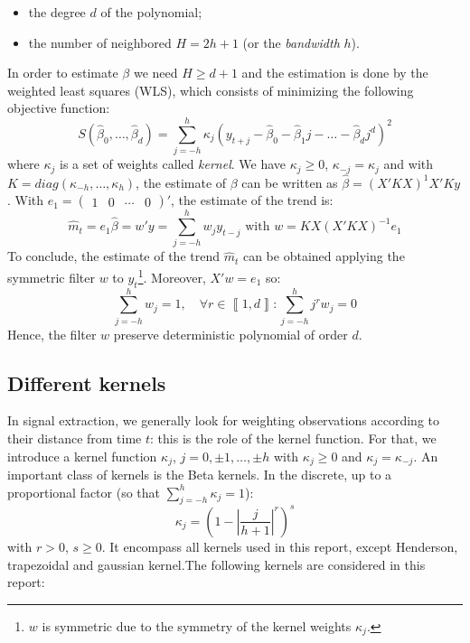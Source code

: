 \documentclass[
  12pt,
  ,
  a4paper]{article}
\newcommand\1{\mathds{1}}
\begin{document}
\begin{itemize}
\item
  the degree \(d\) of the polynomial;
\item
  the number of neighbored \(H=2h+1\) (or the \emph{bandwidth} \(h\)).
\end{itemize}

In order to estimate \(\beta\) we need \(H\geq d+1\) and the estimation is done by the weighted least squares (WLS), which consists of minimizing the following objective function:
\[
S(\hat{\beta}_{0},\dots,\hat{\beta}_{d})=\sum_{j=-h}^{h}\kappa_{j}(y_{t+j}-\hat{\beta}_{0}-\hat{\beta}_{1}j-\dots-\hat{\beta}_{d}j^{d})^{2}
\]
where \(\kappa_j\) is a set of weights called \emph{kernel}. We have \(\kappa_j\geq 0\), \(\kappa_{-j}=\kappa_j\) and with \(K=diag(\kappa_{-h},\dots,\kappa_{h})\), the estimate of \(\beta\) can be written as \(\hat{\beta}=(X'KX)^{1}X'Ky\).
With \(e_{1}=\begin{pmatrix}1&0&\cdots&0\end{pmatrix}'\), the estimate of the trend is:
\[
\hat{m}_{t}=e_{1}\hat{\beta}=w'y=\sum_{j=-h}^{h}w_{j}y_{t-j}\text{ with }w=KX(X'KX)^{-1}e_{1}
\]
To conclude, the estimate of the trend \(\hat{m}_{t}\) can be obtained applying the symmetric filter \(w\) to \(y_t\)\footnote{\(w\) is symmetric due to the symmetry of the kernel weights \(\kappa_j\).}.
Moreover, \(X'w=e_{1}\) so:
\[
\sum_{j=-h}^{h}w_{j}=1,\quad\forall r\in\left\llbracket 1,d\right\rrbracket :\sum_{j=-h}^{h}j^{r}w_{j}=0
\]
Hence, the filter \(w\) preserve deterministic polynomial of order \(d\).

\hypertarget{sec:kernels}{%
\subsection{Different kernels}\label{sec:kernels}}

In signal extraction, we generally look for weighting observations according to their distance from time \(t\): this is the role of the kernel function.
For that, we introduce a kernel function \(\kappa_j\), \(j=0,\pm1,\dots,\pm h\) with \(\kappa_j \geq0\) and \(\kappa_j=\kappa_{-j}\).
An important class of kernels is the Beta kernels. In the discrete, up to a proportional factor (so that \(\sum_{j=-h}^h\kappa_j=1\)):
\[
\kappa_j = \left(
  1-
  \left\lvert
  \frac j {h+1}
  \right\lvert^r
\right)^s
\]
with \(r>0\), \(s\geq 0\).
It encompass all kernels used in this report, except Henderson, trapezoidal and gaussian kernel.The following kernels are considered in this report:
\end{document}
